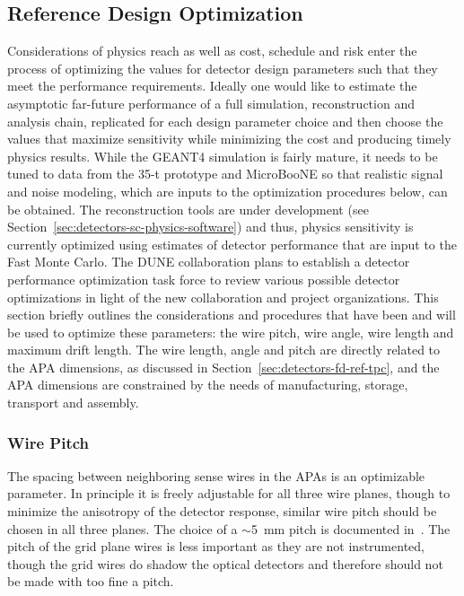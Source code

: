 \subsection{Reference Design Optimization}
\label{sec:detectors-fd-ref-optimization}

Considerations of physics reach as well as
cost, schedule and risk enter the process of optimizing the values for
detector design parameters such that they meet the performance requirements. 
Ideally one would like to estimate the
asymptotic far-future performance of a full simulation, reconstruction
and analysis chain, replicated for each design parameter choice and
then choose the values that maximize sensitivity while minimizing the
cost and producing timely physics results. While the GEANT4 simulation
is fairly mature, it needs to be tuned to data from the 35-t prototype
and MicroBooNE so that realistic signal and noise modeling, which are
inputs to the optimization procedures below, can be obtained. 
The
reconstruction tools are under development (see
Section~\ref{sec:detectors-sc-physics-software}) and thus, physics
sensitivity is currently optimized using estimates of detector
performance that are input to the Fast Monte Carlo. The DUNE
collaboration plans to establish a detector performance optimization
task force to review various possible detector optimizations in light
of the new collaboration and project organizations.  This section
briefly outlines the considerations and procedures that have been and
will be used to optimize these parameters: the wire pitch, wire
angle, wire length and  maximum drift length.  The %
wire length, angle and pitch are directly related to the
APA dimensions, as discussed in
Section~\ref{sec:detectors-fd-ref-tpc}, and the APA dimensions are
constrained by the needs of manufacturing, storage, transport and
assembly.

\subsubsection{Wire Pitch}

The spacing between neighboring sense wires in the APAs is an
optimizable parameter.  In principle it is freely adjustable for all
three wire planes, though to minimize the anisotropy of the detector
response, similar wire pitch should be chosen in all three planes.
The choice of a $\sim$5~mm pitch is documented in~\cite{docdb-3407}.  
The pitch of the grid plane wires is less
important as they are not instrumented, though the grid wires do
shadow the optical detectors and therefore should not be made with too fine a pitch.


